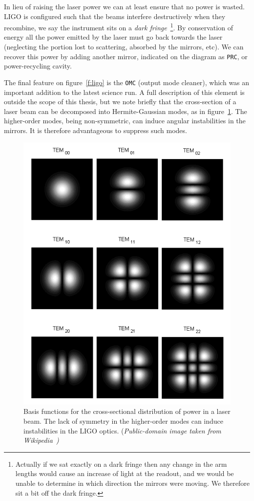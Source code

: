 In lieu of raising the laser power we can at least ensure that no
power is wasted.  LIGO is configured such that the beams interfere
destructively when they recombine, we say the instrument sits on a
\emph{dark fringe}~\footnote{Actually if we sat exactly on a dark
fringe then any change in the arm lengths would cause an increase of
light at the readout, and we would be unable to determine in which
direction the mirrors were moving.  We therefore sit a bit off the
dark fringe.}.  By conservation of energy all the power emitted by the
laser must go back towards the laser (neglecting the portion lost to
scattering, absorbed by the mirrors, etc).  We can recover this power
by adding another mirror, indicated on the diagram as \texttt{PRC}, or
power-recycling cavity.

The final feature on figure~\ref{f:ligo} is the \texttt{OMC} (output
mode cleaner), which was an important addition to the latest science
run.  A full description of this element is outside the scope of this
thesis, but we note briefly that the cross-section of a laser beam can
be decomposed into Hermite-Gaussian modes, as in
figure~\ref{f:hermite_gauss}.  The higher-order modes, being
non-symmetric, can induce angular instabilities in the mirrors.  It is
therefore advantageous to suppress such modes.

\begin{figure}
  \includegraphics[width=\linewidth]{figures/detectors/TEMmn}
  \caption[Laser modes]{
  \label{f:hermite_gauss}
Basis functions for the cross-sectional distribution of power in a
laser beam.  The lack of symmetry in the higher-order modes can induce
instabilities in the LIGO optics. (\it{Public-domain image taken from
Wikipedia}~\cite{wikipedia:temmn})
}
\end{figure}%

